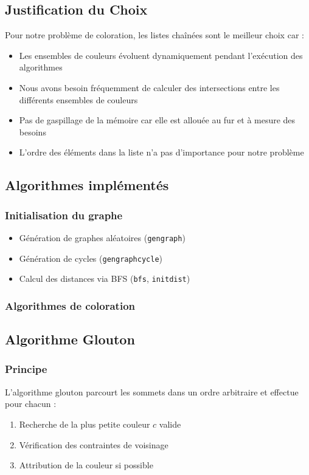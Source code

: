 \documentclass[a4paper,11pt]{article}
\begin{document}
\subsection{Justification du Choix}

Pour notre problème de coloration, les listes chaînées sont le meilleur choix car :

\begin{itemize}
\item Les ensembles de couleurs évoluent dynamiquement pendant l'exécution des algorithmes
\item Nous avons besoin fréquemment de calculer des intersections entre les différents ensembles de couleurs
\item Pas de gaspillage de la mémoire car elle est allouée au fur et à mesure des besoins
\item L'ordre des éléments dans la liste n'a pas d'importance pour notre problème
\end{itemize}

\subsection{Algorithmes implémentés}
\subsubsection{Initialisation du graphe}
\begin{itemize}
\item Génération de graphes aléatoires (\texttt{gengraph})
\item Génération de cycles (\texttt{gengraphcycle})
\item Calcul des distances via BFS (\texttt{bfs}, \texttt{initdist})
\end{itemize}

\subsubsection{Algorithmes de coloration}
\subsection{Algorithme Glouton}
\subsubsection{Principe}
L'algorithme glouton parcourt les sommets dans un ordre arbitraire et effectue pour chacun :
\begin{enumerate}
    \item Recherche de la plus petite couleur $c$ valide
    \item Vérification des contraintes de voisinage
    \item Attribution de la couleur si possible
\end{enumerate}
\end{document}
